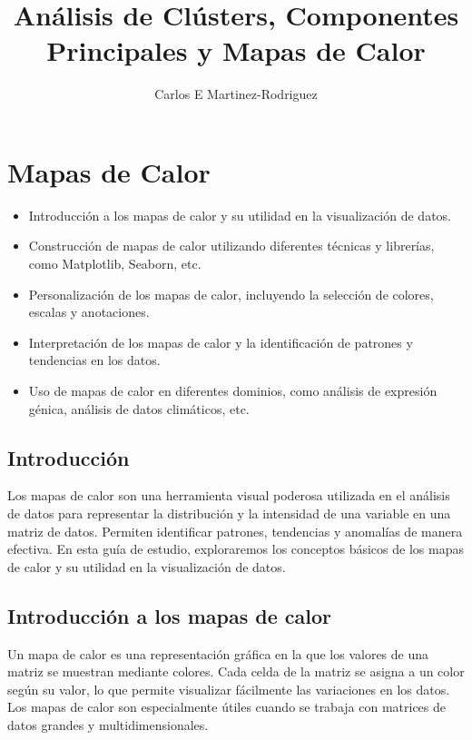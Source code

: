 \documentclass{article}
\title{An\'alisis de Cl\'usters, Componentes Principales y Mapas de Calor}
\author{Carlos E Martinez-Rodriguez}
\begin{document}
\maketitle
\tableofcontents
\newpage
\section{Mapas de Calor}
\begin{itemize}
\item Introducción a los mapas de calor y su utilidad en la visualización de datos.
\item Construcción de mapas de calor utilizando diferentes técnicas y librerías, como Matplotlib, Seaborn, etc.
\item Personalización de los mapas de calor, incluyendo la selección de colores, escalas y anotaciones.
\item Interpretación de los mapas de calor y la identificación de patrones y tendencias en los datos.
\item Uso de mapas de calor en diferentes dominios, como análisis de expresión génica, análisis de datos climáticos, etc.

\end{itemize}

\subsection{Introducción}
Los mapas de calor son una herramienta visual poderosa utilizada en el análisis de datos para representar la distribución y la intensidad de una variable en una matriz de datos. Permiten identificar patrones, tendencias y anomalías de manera efectiva. En esta guía de estudio, exploraremos los conceptos básicos de los mapas de calor y su utilidad en la visualización de datos.

\subsection{Introducción a los mapas de calor}
Un mapa de calor es una representación gráfica en la que los valores de una matriz se muestran mediante colores. Cada celda de la matriz se asigna a un color según su valor, lo que permite visualizar fácilmente las variaciones en los datos. Los mapas de calor son especialmente útiles cuando se trabaja con matrices de datos grandes y multidimensionales.
\end{document}
